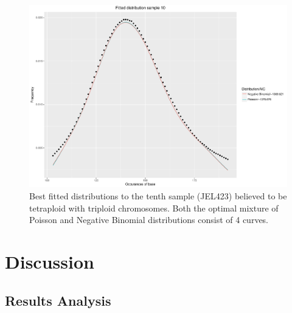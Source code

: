 \documentclass[11pt]{article}
\begin{document}
\begin{figure}[H]
\begin{center}
\includegraphics[scale=0.5]{../Results/Bd_Results/10_Supercontig_1_sample_10_plot.pdf}

\end{center}
\caption{Best fitted distributions to the tenth sample (JEL423) believed to be tetraploid with triploid chromosomes. Both the optimal mixture of Poisson and Negative Binomial distributions consist of 4 curves.}
\end{figure}

\section{Discussion}
\subsection{Results Analysis}
\end{document}
